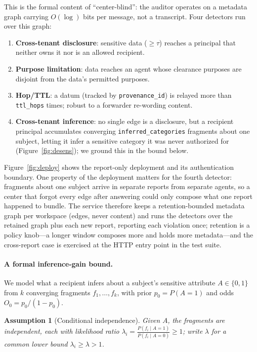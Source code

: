 \documentclass{article}
\newtheorem{assumption}{Assumption}
\begin{document}
This is the formal content of ``center-blind'': the auditor operates on a metadata
graph carrying $O(\log)$ bits per message, not a transcript. Four detectors run
over this graph:
\begin{enumerate}[leftmargin=1.4em]
\item \textbf{Cross-tenant disclosure}: sensitive data ($\geq\tau$) reaches a
principal that neither owns it nor is an allowed recipient.
\item \textbf{Purpose limitation}: data reaches an agent whose clearance purposes
are disjoint from the data's permitted purposes.
\item \textbf{Hop/TTL}: a datum (tracked by \texttt{provenance\_id}) is relayed
more than \texttt{ttl\_hops} times; robust to a forwarder re-wording content.
\item \textbf{Cross-tenant inference}: no single edge is a disclosure, but a
recipient principal accumulates converging \texttt{inferred\_categories}
fragments about one subject, letting it infer a sensitive category it was never
authorized for (Figure~\ref{fig:desens}); we ground this in the bound below.
\end{enumerate}
Figure~\ref{fig:deploy} shows the report-only deployment and its authentication boundary. One property of the deployment matters for the fourth detector: fragments about one subject arrive in separate reports from separate agents, so a center that forgot every edge after answering could only compose what one report happened to bundle. The service therefore keeps a retention-bounded metadata graph per workspace (edges, never content) and runs the detectors over the retained graph plus each new report, reporting each violation once; retention is a policy knob---a longer window composes more and holds more metadata---and the cross-report case is exercised at the HTTP entry point in the test suite.




\paragraph{A formal inference-gain bound.} We model what a recipient infers about
a subject's sensitive attribute $A\in\{0,1\}$ from $k$ converging fragments
$f_1,\dots,f_k$, with prior $p_0=P(A{=}1)$ and odds $O_0=p_0/(1-p_0)$.

\begin{assumption}[Conditional independence]\label{as:ci}
Given $A$, the fragments are independent, each with likelihood ratio
$\lambda_i=\tfrac{P(f_i\mid A{=}1)}{P(f_i\mid A{=}0)}\ge1$; write $\lambda$ for a
common lower bound $\lambda_i\ge\lambda>1$.
\end{assumption}
\end{document}
